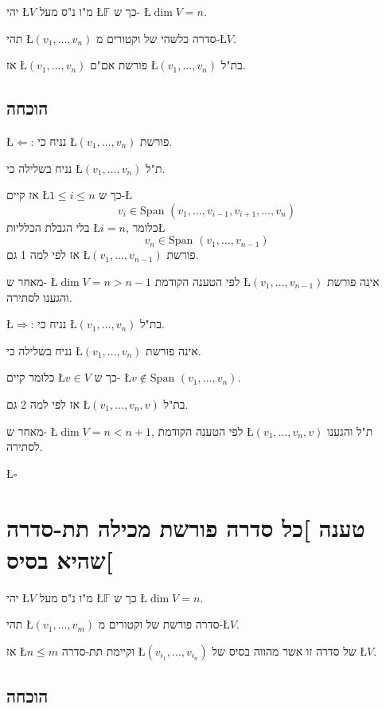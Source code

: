 \documentclass[english,hebrew]{article}
\newcommand{\spn}{\text{Span }}
\begin{document}
יהי \L{$V$} מ"ו נ"ס מעל \L{$\mathbb{F}$} כך ש- \L{$\dim V=n$}.

תהי \L{$(v_{1},\dots,v_{n})$} סדרה כלשהי של וקטורים מ-\L{$V$}.

אז \L{$(v_{1},\dots,v_{n})$} פורשת אם"ם \L{$(v_{1},\dots,v_{n})$}
בת"ל.

\subsection{הוכחה}

\L{$\Leftarrow$}: נניח כי \L{$(v_{1},\dots,v_{n})$} פורשת.

נניח בשלילה כי \L{$(v_{1},\dots,v_{n})$} ת"ל.

אז קיים \L{$1\le i\le n$} כך ש-\L{%
\[
v_{i}\in\spn(v_{1},\dots,v_{i-1},v_{i+1},\dots,v_{n})
\]
}%
בלי הגבלת הכלליות \L{$i=n$}, כלומר\L{%
\[
v_{n}\in\spn(v_{1},\dots,v_{n-1})
\]
}%
 אז לפי למה 1 גם \L{$(v_{1},\dots,v_{n-1})$} פורשת.

מאחר ש- \L{$\dim V=n>n-1$} לפי הטענה הקודמת \L{$(v_{1},\dots,v_{n-1})$}
אינה פורשת והגענו לסתירה.

\L{$\Rightarrow$}: נניח כי \L{$(v_{1},\dots,v_{n})$} בת"ל.

נניח בשלילה כי \L{$(v_{1},\dots,v_{n})$} אינה פורשת.

כלומר קיים \L{$v\in V$} כך ש- \L{$v\notin\spn(v_{1},\dots,v_{n})$}. 

אז לפי למה 2 גם \L{$(v_{1},\dots,v_{n},v)$} בת"ל.

מאחר ש- \L{$\dim V=n<n+1$}, לפי הטענה הקודמת \L{$(v_{1},\dots,v_{n},v)$}
ת"ל והגענו לסתירה.
\begin{flushright}
\L{$\square$}
\par\end{flushright}

\section{טענה {]}כל סדרה פורשת מכילה תת-סדרה שהיא בסיס{[}}

יהי \L{$V$} מ"ו נ"ס מעל \L{$\mathbb{F}$} כך ש \L{$\dim V=n$}.

תהי \L{$(v_{1},\dots,v_{m})$} סדרה פורשת של וקטורים מ-\L{$V$}.

אז \L{$n\le m$} וקיימת תת-סדרה \L{$(v_{i_{1}},\dots,v_{i_{n}})$}
של סדרה זו אשר מהווה בסיס של \L{$V$}.

\subsection{הוכחה}
\end{document}
